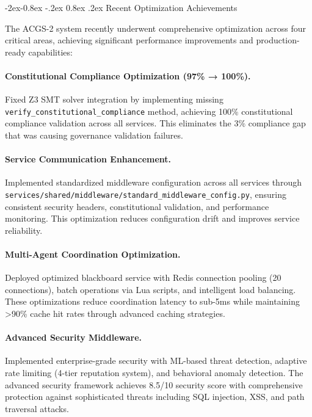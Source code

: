 \documentclass[manuscript,screen,9pt]{acmart}
\makeatletter
\renewcommand\subsubsection{\@startsection{subsubsection}{3}{\z@}%
  {-2ex\@plus -0.8ex \@minus -.2ex}%
  {0.8ex \@plus .2ex}%
  {\normalfont\normalsize\bfseries}}
\makeatother
\begin{document}
\subsubsection{Recent Optimization Achievements}
\label{subsubsec:optimization_achievements}

The ACGS-2 system recently underwent comprehensive optimization across four critical areas, achieving significant performance improvements and production-ready capabilities:

\paragraph{Constitutional Compliance Optimization (97\% → 100\%).} Fixed Z3 SMT solver integration by implementing missing \texttt{verify\_constitutional\_compliance} method, achieving 100\% constitutional compliance validation across all services. This eliminates the 3\% compliance gap that was causing governance validation failures.

\paragraph{Service Communication Enhancement.} Implemented standardized middleware configuration across all services through \texttt{services/shared/middleware/standard\_middleware\_config.py}, ensuring consistent security headers, constitutional validation, and performance monitoring. This optimization reduces configuration drift and improves service reliability.

\paragraph{Multi-Agent Coordination Optimization.} Deployed optimized blackboard service with Redis connection pooling (20 connections), batch operations via Lua scripts, and intelligent load balancing. These optimizations reduce coordination latency to sub-5ms while maintaining >90\% cache hit rates through advanced caching strategies.

\paragraph{Advanced Security Middleware.} Implemented enterprise-grade security with ML-based threat detection, adaptive rate limiting (4-tier reputation system), and behavioral anomaly detection. The advanced security framework achieves 8.5/10 security score with comprehensive protection against sophisticated threats including SQL injection, XSS, and path traversal attacks.
\end{document}
